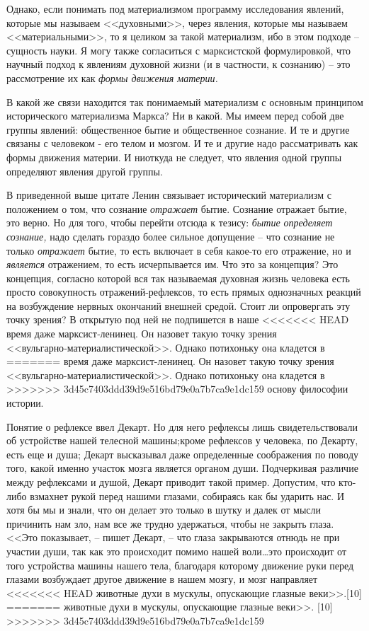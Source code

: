 \documentclass{book}
\begin{document}
Однако, если понимать под материализмом программу иссле­дования явлений, которые мы называем <<духовными>>, через явления, которые 
мы называем <<материальными>>, то я целиком за такой материализм, ибо в этом подходе -- сущность науки. Я могу также согласиться с 
марксистской формулировкой, что научный подход к явлениям духовной жизни (и в частности, к сознанию) -- это рассмотрение их как 
\textit{формы движения материи.}

В какой же связи находится так понимаемый материализм с основным принципом исторического материализма Маркса?
Ни в какой. Мы имеем перед собой две группы явлений: общественное бытие и общественное сознание. И те и другие связаны с 
человеком - его телом и мозгом. И те и другие надо рассматривать как формы движения материи. И ниоткуда не следует, что явления 
одной группы определяют явления другой группы.

В приведенной выше цитате Ленин связывает исторический материализм с положением о том, что сознание \textit{отражает}  бытие. 
Сознание отражает бытие, это верно. Но для того, чтобы перей­ти отсюда к тезису: \textit{бытие определяет сознание,}  надо 
сделать гораздо более сильное допущение -- что сознание не только \textit{от­ражает}  бытие, то есть включает в себя какое-то его 
отражение, но и \textit{является}  отражением, то есть исчерпывается им. Что это за концепция? Это концепция, согласно которой 
вся так назы­ваемая духовная жизнь человека есть просто совокупность отражений-рефлексов, то есть прямых однозначных реакций на 
возбуждение нервных окончаний внешней средой. Стоит ли опровергать эту точку зрения? В открытую под ней не подпи­шется в наше 
<<<<<<< HEAD
время даже марксист‑ленинец. Он назовет такую точку зрения <<вульгарно‑материалистической>>. Однако поти­хоньку она кладется в 
=======
время даже марксист-ленинец. Он назовет такую точку зрения <<вульгарно-материалистической>>. Однако поти­хоньку она кладется в 
>>>>>>> 3d45c7403ddd39d9e516bd79e0a7b7ca9e1dc159
основу философии истории.

Понятие о рефлексе ввел Декарт. Но для него рефлексы лишь свидетельствовали об устройстве нашей телесной машины;кроме рефлексов 
у человека, по Декарту, есть еще и душа; Декарт высказывал даже определенные соображения по пово­ду того, какой именно участок 
мозга является органом души. Подчеркивая различие между рефлексами и душой, Декарт приводит такой пример. Допустим, что кто-либо 
взмахнет рукой перед нашими глазами, собираясь как бы ударить нас. И хотя бы мы и знали, что он делает это только в шутку и 
далек от мысли причинить нам зло, нам все же трудно удержаться, чтобы не закрыть глаза. <<Это показывает, -- пишет Декарт, -- что 
глаза закрываются отнюдь не при участии души, так как это происхо­дит помимо нашей воли\ldots это происходит от того устройства 
машины нашего тела, благодаря которому движение руки перед глазами возбуждает другое движение в нашем мозгу, и мозг направляет 
<<<<<<< HEAD
животные духи в мускулы, опускающие глазные веки>>.[10]
=======
животные духи в мускулы, опускающие глазные веки>>. [10]
>>>>>>> 3d45c7403ddd39d9e516bd79e0a7b7ca9e1dc159
\end{document}

